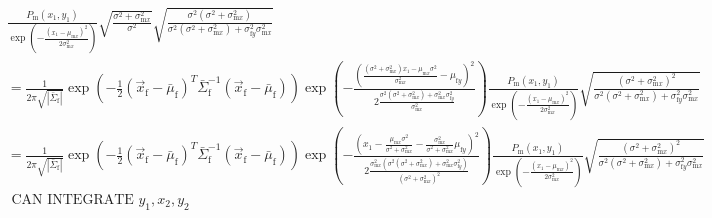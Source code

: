 \documentclass{article}\usepackage[]{graphicx}\usepackage[]{color}
\newcommand{\x}[1]{\text{#1}}
\begin{document}
\begin{landscape}
\begin{align*}
\\&\frac{P_\x{m}(x_1,y_1)}{\exp\left(-\frac{(x_1-\mu_{\x{m}x})^2}{2\sigma_{\x{m}x}^2}\right)}\sqrt{\frac{\sigma^2+\sigma_{\x{m}x}^2}{\sigma^2}}\sqrt{\frac{\sigma^2(\sigma^2+\sigma_{\x{m}x}^2)}{\sigma^2(\sigma^2+\sigma_{\x{m}x}^2)+\sigma_{\x{f}y}^2\sigma_{\x{m}x}^2}}
\\&=\frac{1}{2\pi\sqrt{|\bar{\Sigma}_{\x{f}}|}}\exp\left(-\frac{1}{2}(\vec{x}_\x{f}-\bar{\mu}_{\x{f}})^T\bar{\Sigma}_\x{f}^{-1}(\vec{x}_\x{f}-\bar{\mu}_\x{f})\right)\exp\left(-\frac{\left(\frac{(\sigma^2+\sigma_{\x{m}x}^2)x_1-\mu_{\x{m}x}\sigma^2}{\sigma_{\x{m}x}^2}-\mu_{\x{f}y}\right)^2}{2\frac{\sigma^2(\sigma^2+\sigma_{\x{m}x}^2)+\sigma_{\x{m}x}^2\sigma_{\x{f}y}^2}{\sigma_{\x{m}x}^2}}\right)\frac{P_\x{m}(x_1,y_1)}{\exp\left(-\frac{(x_1-\mu_{\x{m}x})^2}{2\sigma_{\x{m}x}^2}\right)}\sqrt{\frac{(\sigma^2+\sigma_{\x{m}x}^2)^2}{\sigma^2(\sigma^2+\sigma_{\x{m}x}^2)+\sigma_{\x{f}y}^2\sigma_{\x{m}x}^2}}
\\&=\frac{1}{2\pi\sqrt{|\bar{\Sigma}_{\x{f}}|}}\exp\left(-\frac{1}{2}(\vec{x}_\x{f}-\bar{\mu}_{\x{f}})^T\bar{\Sigma}_\x{f}^{-1}(\vec{x}_\x{f}-\bar{\mu}_\x{f})\right)\exp\left(-\frac{\left(x_1-\frac{\mu_{\x{m}x}\sigma^2}{\sigma^2+\sigma_{\x{m}x}^2}-\frac{\sigma_{\x{m}x}^2}{\sigma^2+\sigma_{\x{m}x}^2}\mu_{\x{f}y}\right)^2}{2\frac{\sigma_{\x{m}x}^2(\sigma^2(\sigma^2+\sigma_{\x{m}x}^2)+\sigma_{\x{m}x}^2\sigma_{\x{f}y}^2)}{(\sigma^2+\sigma_{\x{m}x}^2)^2}}\right)\frac{P_\x{m}(x_1,y_1)}{\exp\left(-\frac{(x_1-\mu_{\x{m}x})^2}{2\sigma_{\x{m}x}^2}\right)}\sqrt{\frac{(\sigma^2+\sigma_{\x{m}x}^2)^2}{\sigma^2(\sigma^2+\sigma_{\x{m}x}^2)+\sigma_{\x{f}y}^2\sigma_{\x{m}x}^2}} 
\\&\text{ CAN INTEGRATE } y_1,x_2,y_2
\end{align*}


\end{landscape}
\end{document}

